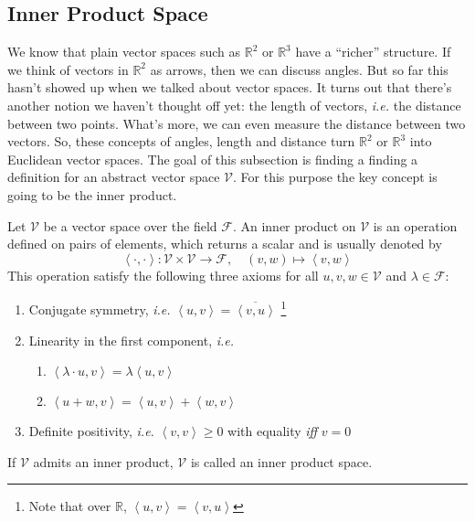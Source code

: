 \subsection{Inner Product Space}\label{subsec-inner-product-space}

\begin{flushleft}
	We know that plain vector spaces such as $\mathbb{R}^2$ or $\mathbb{R}^3$
	have a \enquote{richer} structure. If we think of vectors in $\mathbb{R}^2$
	as arrows, then we can discuss angles. But so far this hasn't showed up when
	we talked about vector spaces. It turns out that there's another notion we
	haven't thought off yet: the length of vectors, \textit{i.e.} the distance
	between two points. What's more, we can even measure the distance between two
	vectors. So, these concepts of angles, length and distance turn $\mathbb{R}^2$
	or $\mathbb{R}^3$ into Euclidean vector spaces. The goal of this subsection is
	finding a finding a definition for an abstract vector space $\mathcal{V}$. For
	this purpose the key concept is going to be the inner product.
\end{flushleft}

\begin{definition}\label{def-inner-product}
	Let $\mathcal{V}$ be a vector space over the field $\mathcal{F}$. An inner
	product on $\mathcal{V}$ is an operation defined on pairs of elements, which
	returns a scalar and is usually denoted by
	\begin{equation}
		\left<\cdot,\cdot\right>:\mathcal{V}\times\mathcal{V}\to\mathcal{F},
		\quad(v,w)\mapsto\left<v,w\right>
	\end{equation}
	This operation satisfy the following three axioms for all $u,v,w\in\mathcal{V}$ and
	$\lambda\in\mathcal{F}$:
	\begin{enumerate}
		\item Conjugate symmetry, \textit{i.e.} $\left<u,v\right>=\overline{\left<v,u\right>}$
		      \footnote{Note that over $\mathbb{R}$, $\left<u,v\right>=\left<v,u\right>$}
		\item Linearity in the first component, \textit{i.e.}
		      \begin{enumerate}
			      \item $\left<\lambda\cdot u,v\right>=\lambda\left<u,v\right>$
			      \item $\left<u+w,v\right>=\left<u,v\right>+\left<w,v\right>$
		      \end{enumerate}
		\item Definite positivity, \textit{i.e.} $\left<v,v\right>\geq0$ with equality
		      \textit{iff} $v=0$
	\end{enumerate}
	If $\mathcal{V}$ admits an inner product, $\mathcal{V}$ is called an inner product space.
\end{definition}

